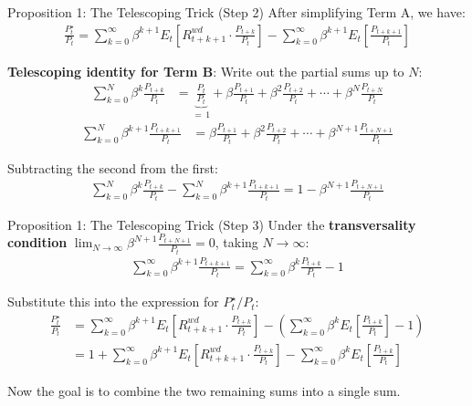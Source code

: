 \documentclass{beamer}
\begin{document}
\begin{frame}{Proposition 1: The Telescoping Trick (Step 2)}
	After simplifying Term A, we have:
	\begin{align*}
		\frac{P_t^\star}{P_t} = \sum_{k=0}^{\infty} \beta^{k+1} E_t\!\left[R_{t+k+1}^{wd} \cdot \frac{P_{t+k}}{P_t}\right] - \sum_{k=0}^{\infty} \beta^{k+1} E_t\!\left[\frac{P_{t+k+1}}{P_t}\right]
	\end{align*}

	\textbf{Telescoping identity for Term B}: Write out the partial sums up to $N$:
	\begin{align*}
		\sum_{k=0}^{N} \beta^{k} \frac{P_{t+k}}{P_t} &= \underbrace{\frac{P_t}{P_t}}_{=\,1} + \beta\frac{P_{t+1}}{P_t} + \beta^2\frac{P_{t+2}}{P_t} + \cdots + \beta^N\frac{P_{t+N}}{P_t}
	\end{align*}
	\begin{align*}
		\sum_{k=0}^{N} \beta^{k+1} \frac{P_{t+k+1}}{P_t} &= \beta\frac{P_{t+1}}{P_t} + \beta^2\frac{P_{t+2}}{P_t} + \cdots + \beta^{N+1}\frac{P_{t+N+1}}{P_t}
	\end{align*}

	Subtracting the second from the first:
	\begin{align*}
		\sum_{k=0}^{N} \beta^{k} \frac{P_{t+k}}{P_t} - \sum_{k=0}^{N} \beta^{k+1} \frac{P_{t+k+1}}{P_t} = 1 - \beta^{N+1}\frac{P_{t+N+1}}{P_t}
	\end{align*}
\end{frame}

\begin{frame}{Proposition 1: The Telescoping Trick (Step 3)}
	Under the \textbf{transversality condition} $\displaystyle\lim_{N\to\infty} \beta^{N+1} \frac{P_{t+N+1}}{P_t} = 0$, taking $N \to \infty$:
	\begin{align*}
		\sum_{k=0}^{\infty} \beta^{k+1} \frac{P_{t+k+1}}{P_t} = \sum_{k=0}^{\infty} \beta^{k} \frac{P_{t+k}}{P_t} - 1
	\end{align*}

	Substitute this into the expression for $P_t^\star/P_t$:
	\begin{align*}
		\frac{P_t^\star}{P_t} &= \sum_{k=0}^{\infty} \beta^{k+1} E_t\!\left[R_{t+k+1}^{wd} \cdot \frac{P_{t+k}}{P_t}\right] - \left(\sum_{k=0}^{\infty} \beta^{k} E_t\!\left[\frac{P_{t+k}}{P_t}\right] - 1\right) \\[6pt]
		&= 1 + \sum_{k=0}^{\infty} \beta^{k+1} E_t\!\left[R_{t+k+1}^{wd} \cdot \frac{P_{t+k}}{P_t}\right] - \sum_{k=0}^{\infty} \beta^{k} E_t\!\left[\frac{P_{t+k}}{P_t}\right]
	\end{align*}

	Now the goal is to combine the two remaining sums into a single sum.
\end{frame}
\end{document}
